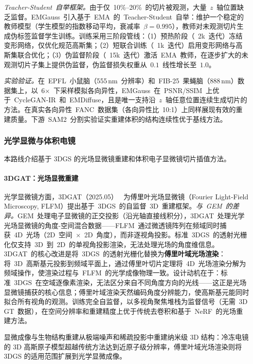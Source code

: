 \textit{Teacher-Student~自举框架。}由于仅~10\%--20\%~的切片被观测，大量~$z$~轴位置缺乏监督。EMGauss~引入基于~EMA~的~Teacher-Student~自举：维护一个稳定的教师模型（学生模型的指数移动平均，衰减率~$\beta = 0.995$），教师对未观测切片生成伪标签监督学生训练。训练采用三阶段管线：（1）预热阶段（~2k~迭代）冻结变形网络，仅优化规范高斯集；（2）短联合训练（~1k~迭代）启用变形网络与高斯集联合优化；（3）伪监督阶段（~15k~迭代）激活~EMA~教师，在逐步扩大的未观测切片子集上提供伪监督，伪监督损失权重从~$0.1$~线性增长至~$1.0$。

\textit{实验验证。}在~EPFL~小鼠脑（555\,nm~分辨率）和~FIB-25~果蝇脑（888\,nm）数据集上，以~6$\times$~下采样模拟各向异性，EMGauss~在~PSNR/SSIM~上优于~CycleGAN-IR~和~EMDiffuse，且是唯一支持沿~$z$~轴任意位置连续生成切片的方法。在真实各向异性~FANC~数据集（各向异性比~10:1）上同样展现有效的重建质量。下游~SAM2~分割实验证实重建体积的结构连续性优于基线方法。

\subsubsection{光学显微与体积电镜}

本路线介绍基于 3DGS 的光场显微镜重建和体积电子显微镜切片插值方法。

\paragraph{3DGAT：光场显微重建}

光学显微镜方面，3DGAT（2025.05）~\cite{2505_12875} 为傅里叶光场显微镜（Fourier Light-Field Microscopy, FLFM）提出基于~3DGS~的自监督~3D~重建框架。\textit{与~GEM~的差异。}GEM~处理电子显微镜的正交投影（沿光轴直接线积分），3DGAT~处理光学光场显微镜的角度-空间混合数据——FLFM~通过微透镜阵列在频域同时捕获~4D~光场（2D~空间~$\times$~2D~角度），而非逐视角投影。标准~3DGS~的透射光栅化仅支持~3D~到~2D~的单视角投影渲染，无法处理光场的角度维信息。3DGAT~的核心改进是将~3DGS~的透射光栅化替换为\textbf{傅里叶域光场渲染}：将~3D~高斯基元投影到频域平面上，通过傅里叶切片定理将~4D~光场渲染分解为频域操作，使渲染过程与~FLFM~的光学成像物理一致。设计动机在于：标准~3DGS~在空域逐像素渲染，无法区分来自不同角度方向的光线——这正是光场显微镜捕获的核心信息；傅里叶域渲染天然编码角度分辨能力，使高斯基元能同时拟合所有视角的观测。训练完全自监督，以多视角聚焦堆栈为监督信号（无需~3D GT~数据），在空间分辨率和重建精度上优于传统去卷积和基于~NeRF~的光场重建方法。

\begin{takeaway}
显微成像与生物结构重建从极端噪声和稀疏投影中重建纳米级 3D 结构：冷冻电镜的 3D 高斯原子模型超越传统方法达到近原子级分辨率，傅里叶域光场渲染则将 3DGS 的适用范围扩展到光学显微成像。
\end{takeaway}

